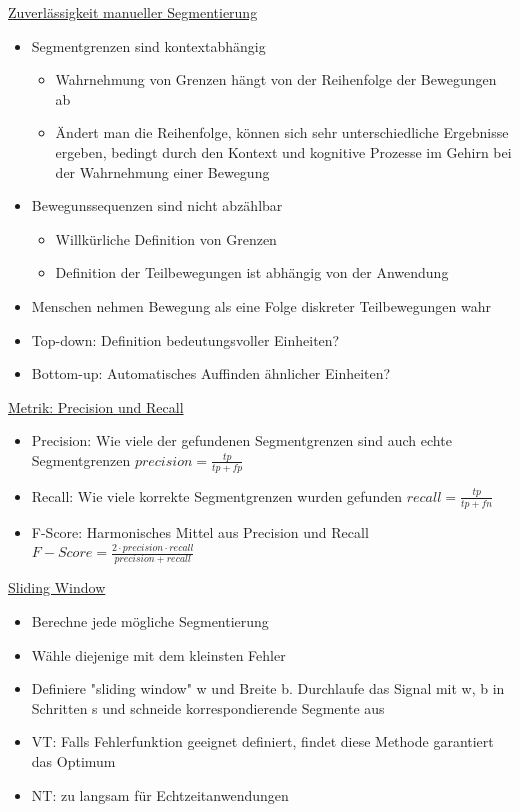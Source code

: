 \documentclass[a4paper,10pt,oneside]{article}
\begin{document}
\underline{Zuverlässigkeit manueller Segmentierung} \\
	\begin{itemize}
		\item Segmentgrenzen sind kontextabhängig
			\begin{itemize}
				\item Wahrnehmung von Grenzen hängt von der Reihenfolge der Bewegungen ab
				\item Ändert man die Reihenfolge, können sich sehr unterschiedliche Ergebnisse ergeben, bedingt durch den Kontext und kognitive Prozesse im Gehirn bei der Wahrnehmung einer Bewegung
			\end{itemize}
		\item Bewegunssequenzen sind nicht abzählbar
			\begin{itemize}
				\item Willkürliche Definition von Grenzen
				\item Definition der Teilbewegungen ist abhängig von der Anwendung
			\end{itemize}
		\item Menschen nehmen Bewegung als eine Folge diskreter Teilbewegungen wahr
		\item Top-down: Definition bedeutungsvoller Einheiten?
		\item Bottom-up: Automatisches Auffinden ähnlicher Einheiten?
	\end{itemize}
 		
\underline{Metrik: Precision und Recall} \\	
 	\begin{itemize}
 		\item Precision: Wie viele der gefundenen Segmentgrenzen sind auch echte Segmentgrenzen $precision = \frac{tp}{tp + fp}$
 		\item Recall: Wie viele korrekte Segmentgrenzen wurden gefunden $recall = \frac{tp}{tp + fn}$
 		\item F-Score: Harmonisches Mittel aus Precision und Recall $F-Score= \frac{2 \cdot precision \cdot recall}{precision + recall}$
 	\end{itemize}
 		
\underline{Sliding Window} \\ 		
	\begin{itemize}
		\item Berechne jede mögliche Segmentierung
		\item Wähle diejenige mit dem kleinsten Fehler
		\item Definiere "sliding window" w und Breite b. Durchlaufe das Signal mit w, b in Schritten s und schneide korrespondierende Segmente aus
		\item VT: Falls Fehlerfunktion geeignet definiert, findet diese Methode garantiert das Optimum
		\item NT: zu langsam für Echtzeitanwendungen
	\end{itemize}
	
\end{document}
